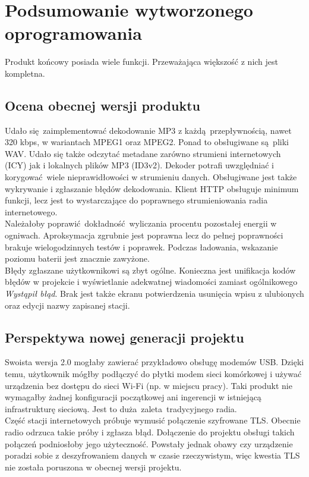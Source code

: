 \documentclass[polish]{aghengthesis}
\begin{document}
	\section{Podsumowanie wytworzonego oprogramowania}
		Produkt końcowy posiada wiele funkcji. Przeważająca większość z nich jest kompletna.
		
		\subsection{Ocena obecnej wersji produktu}
			Udało się zaimplementować dekodowanie MP3 z każdą przepływnością, nawet 320 kbps, w wariantach MPEG1 oraz MPEG2. Ponad to obsługiwane są pliki WAV. Udało się także odczytać metadane zarówno strumieni internetowych (ICY) jak i lokalnych plików MP3 (ID3v2). Dekoder potrafi uwzględniać i korygować wiele nieprawidłowości w strumieniu danych. Obsługiwane jest także wykrywanie i zgłaszanie błędów dekodowania. Klient HTTP obsługuje minimum funkcji, lecz jest to wystarczające do poprawnego strumieniowania radia internetowego.
			$ $\\
			
			Należałoby poprawić dokładność wyliczania procentu pozostałej energii w ogniwach. Aproksymacja zgrubnie jest poprawna lecz do pełnej poprawności brakuje wielogodzinnych testów i poprawek. Podczas ładowania, wskazanie poziomu baterii jest znacznie zawyżone.
			$ $\\
			
			Błędy zgłaszane użytkownikowi są zbyt ogólne. Konieczna jest unifikacja kodów błędów w projekcie i wyświetlanie adekwatnej wiadomości zamiast ogólnikowego \textit{Wystąpił błąd}. Brak jest także ekranu potwierdzenia usunięcia wpisu z ulubionych oraz edycji nazwy zapisanej stacji.
		
		\subsection{Perspektywa nowej generacji projektu}
			Swoista wersja 2.0 mogłaby zawierać przykładowo obsługę modemów USB. Dzięki temu, użytkownik mógłby podłączyć do płytki modem sieci komórkowej i używać urządzenia bez dostępu do sieci Wi-Fi (np. w miejscu pracy). Taki produkt nie wymagałby żadnej konfiguracji początkowej ani ingerencji w istniejącą infrastrukturę sieciową. Jest to duża zaleta tradycyjnego radia.
			$ $\\
			
			Część stacji internetowych próbuje wymusić połączenie szyfrowane TLS. Obecnie radio odrzuca takie próby i zgłasza błąd. Dołączenie do projektu obsługi takich połączeń podniosłoby jego użyteczność. Powstały jednak obawy czy urządzenie poradzi sobie z deszyfrowaniem danych w czasie rzeczywistym, więc kwestia TLS nie została poruszona w obecnej wersji projektu.
			$ $\\
			
\end{document}
